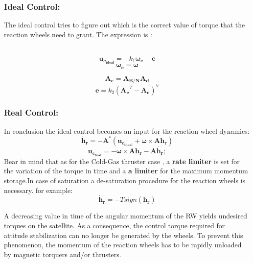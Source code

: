 \documentclass[11pt]{article}
\begin{document}
  \subsubsection{Ideal Control:}\label{control}
  The ideal control tries to figure out  which is the correct value of torque that the reaction wheels need to grant.
  The expression is \label{erri}:\\\\
  \begin{minipage}{.5\textwidth}
  \begin{equation}
  \mathbf{u_{c_{ideal}}}=-k_1\boldsymbol{\omega_e}-\mathbf{e}
  \end{equation}
  \begin{equation}
  \boldsymbol{\omega_e}=\boldsymbol{\omega}
  \end{equation}
  \end{minipage}
  \begin{minipage}{.5\textwidth}
  \begin{equation}
    \mathbf{A_e}=\mathbf{A_{B/N}}\mathbf{A_d}
  \end{equation}
    \begin{equation}
  \mathbf{e}=k_2(\mathbf{A_e}^T-\mathbf{A_e})^{V}
  \end{equation}
  \end{minipage}
  \subsubsection{Real Control:}\label{real}
  In conclusion the ideal control becomes an input for the reaction wheel dynamics:
  \begin{equation}
  \mathbf{\dot{h}_r}=-\mathbf{A^*}(\mathbf{u_{c_{ideal}}}+\boldsymbol{\omega}\times \mathbf{A}\mathbf{h_r})
  \end{equation}
  \begin{equation}
      \mathbf{u_{c_{real}}}=-\boldsymbol{\omega}\times\mathbf{A h_r}-\mathbf{A\dot{h_r}};
  \end{equation}
  Bear in mind that as for the Cold-Gas thruster case , a \textbf{rate limiter} is set for the variation of the torque in time and a \textbf{a limiter} for the maximum momentum storage.In case of saturation a de-saturation procedure for the reaction wheels is necessary. for example:
  \begin{equation}
     \mathbf{\dot{h}_r}=-Tsign( \mathbf{{h}_r})
  \end{equation}
  
   A decreasing value in time of the angular momentum of the RW yields undesired torques on the satellite. As a consequence, the control torque required for attitude stabilization can no longer be generated by the wheels. To prevent this phenomenon, the momentum of the reaction wheels has to be rapidly unloaded by magnetic torquers and/or thrusters.
\end{document}
